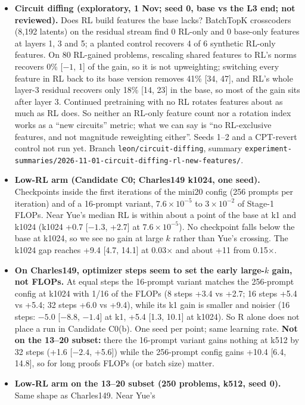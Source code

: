 {\begin{itemize}[nosep,leftmargin=1.2em]
  \item \textbf{Circuit diffing (exploratory, 1 Nov; seed 0, base vs the L3 end; not reviewed).} Does RL build features
    the base lacks? BatchTopK crosscoders (8,192 latents) on the residual stream find 0 RL-only and 0 base-only
    features at layers 1, 3 and 5; a planted control recovers 4 of 6 synthetic RL-only features. On 80 RL-gained
    problems, rescaling shared features to RL's norms recovers 0\% [$-1$, 1] of the gain, so it is not upweighting;
    switching every feature in RL back to its base version removes 41\% [34, 47], and RL's whole layer-3 residual
    recovers only 18\% [14, 23] in the base, so most of the gain sits after layer 3. Continued pretraining with no RL
    rotates features about as much as RL does. So neither an RL-only feature count nor a rotation index works as a
    ``new circuits'' metric; what we can say is ``no RL-exclusive features, and not magnitude reweighting either''.
    Seeds 1--2 and a CPT-revert control not run yet. Branch \nolinkurl{leon/circuit-diffing}, summary
    \nolinkurl{experiment-summaries/2026-11-01-circuit-diffing-rl-new-features/}.
  \item \textbf{Low-RL arm (Candidate C0; Charles149 k1024, one seed).} Checkpoints inside the first iterations of the
    mini20 config (256 prompts per iteration) and of a 16-prompt variant, $7.6\times10^{-5}$ to
    $3\times10^{-2}$ of Stage-1 FLOPs. Near Yue's median RL is within about a point of the base at k1 and k1024
    (k1024 +0.7 [$-1.3$, +2.7] at $7.6\times10^{-5}$). No checkpoint falls below the base at k1024, so we see no gain
    at large $k$ rather than Yue's crossing. The k1024 gap reaches +9.4 [4.7, 14.1] at 0.03$\times$ and about +11 from
    0.15$\times$.
  \item \textbf{On Charles149, optimizer steps seem to set the early large-$k$ gain, not FLOPs.} At equal steps the
    16-prompt variant matches the 256-prompt config at k1024 with 1/16 of the FLOPs (8 steps +3.4 vs +2.7; 16 steps
    +5.4 vs +5.4; 32 steps +6.0 vs +9.4), while its k1 gain is smaller and noisier (16 steps: $-5.0$ [$-8.8$, $-1.4$]
    at k1, +5.4 [1.3, 10.1] at k1024). So R alone does not place a run in Candidate C0(b). One seed per point; same
    learning rate. \textbf{Not on the 13--20 subset:} there the 16-prompt variant gains nothing at k512 by 32 steps
    (+1.6 [$-2.4$, +5.6]) while the 256-prompt config gains +10.4 [6.4, 14.8], so for long proofs FLOPs (or batch
    size) matter.
  \item \textbf{Low-RL arm on the 13--20 subset (250 problems, k512, seed 0).} Same shape as Charles149. Near Yue's

\end{itemize}}
